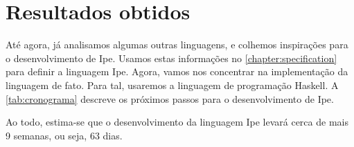 
\chapter{Resultados obtidos}\label{chapter:resultados-obtidos}

Até agora, já analisamos algumas outras linguagens, e colhemos inspirações para
o desenvolvimento de Ipe. Usamos estas informações no \autoref{chapter:specification}
para definir a linguagem Ipe. Agora, vamos nos concentrar na implementação da
linguagem de fato. Para tal, usaremos a linguagem de programação Haskell.  A
\autoref{tab:cronograma} descreve os próximos passos para o desenvolvimento de Ipe.

\begin{table}[htb]
    \caption{Cronograma de desenvolvimento para a linguagem Ipe}
    \label{tab:cronograma}
\end{table}

Ao todo, estima-se que o desenvolvimento da linguagem Ipe levará cerca de mais 9
semanas, ou seja, 63 dias.

